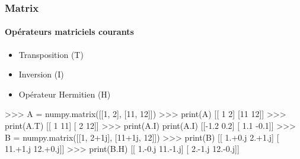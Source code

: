 \begin{frame}[fragile]
\frametitle{Matrix}
\framesubtitle{Opérateurs matriciels courants}
\begin{itemize}
 \item Transposition (T)
 \item Inversion (I)
 \item Opérateur Hermitien (H)
\end{itemize}
\begin{pythonConsole}
>>> A = numpy.matrix([[1, 2], [11, 12]])
>>> print(A)
[[ 1  2]
 [11 12]]
>>> print(A.T)
[[ 1 11]
 [ 2 12]]
>>> print(A.I)
print(A.I)
[[-1.2  0.2]
 [ 1.1 -0.1]]
>>> B = numpy.matrix([[1, 2+1j], [11+1j, 12]])
>>> print(B)
[[  1.+0.j   2.+1.j]
 [ 11.+1.j  12.+0.j]]
>>> print(B.H)
[[  1.-0.j  11.-1.j]
 [  2.-1.j  12.-0.j]]
\end{pythonConsole}
\end{frame}
